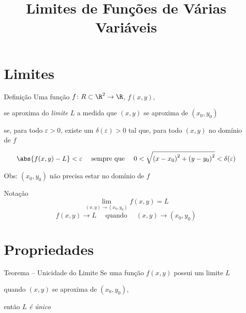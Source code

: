 
\usepackage{calculo_varias_variaveis-1}

\title{Limites de Funções de Várias Variáveis}



\addtitle

\section{Limites}

\begin{frame}{Definição}
  Uma função
  \(f\colon R \subset \R^2 \to \R\), \;
  \pause
  \(f(x, y)\),

  \pause
  se aproxima do \emph{limite} $L$
  a medida que \((x, y)\) se aproxima de \((x_0, y_0)\)

  \pause
  se, para todo \emph{$\varepsilon>0$,}
  \pause
  existe um \emph{\(\delta(\varepsilon)>0\)}
  \pause
  tal que,
  \pause
  para todo \((x, y)\) no domínio de $f$

  \pause
  \[
    \abs{f(x, y)-L} < \varepsilon
    \quad\text{ sempre que }\quad
    0 < \sqrt{ \left(x-x_0\right)^2 + \left(y-y_0\right)^2 } < \delta(\varepsilon)
  \]

  \pause
  Obs: \((x_0, y_0)\) não precisa estar no domínio de $f$
\end{frame}

\begin{frame}{Notação}
  \[
    \lim_{(x, y)\to(x_0, y_0)} f(x, y) = L
  \]
  \pause
  \vspace{\baselineskip}
  \[
    f(x, y) \to L \quad\text{ quando }\quad (x, y)\to(x_0, y_0)
  \]
\end{frame}

\section{Propriedades}

\begin{frame}{Teorema -- Unicidade do Limite}
  Se uma função \(f(x, y)\) possui um limite $L$

  quando \((x, y)\) se aproxima de \((x_0, y_0)\),

  \pause
  então \emph{$L$ é único}
\end{frame}

